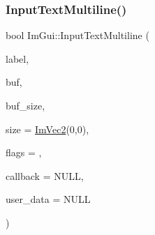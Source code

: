 \subsubsection{\texorpdfstring{Input\+Text\+Multiline()}{InputTextMultiline()}\hspace{0.1cm}{\footnotesize\ttfamily [2/2]}}
{\footnotesize\ttfamily bool Im\+Gui\+::\+Input\+Text\+Multiline (\begin{DoxyParamCaption}\item[{const char $\ast$}]{label,  }\item[{char $\ast$}]{buf,  }\item[{size\+\_\+t}]{buf\+\_\+size,  }\item[{const \mbox{\hyperlink{struct_im_vec2}{Im\+Vec2}} \&}]{size = {\ttfamily \mbox{\hyperlink{struct_im_vec2}{Im\+Vec2}}(0,0)},  }\item[{\mbox{\hyperlink{imgui_8h_a7d2c6153a6b9b5d3178ce82434ac9fb8}{Im\+Gui\+Input\+Text\+Flags}}}]{flags = {},  }\item[{\mbox{\hyperlink{imgui_8h_a65fd2b568a62c9aa2a28a8a13eb65ad7}{Im\+Gui\+Input\+Text\+Callback}}}]{callback = {\ttfamily NULL},  }\item[{void $\ast$}]{user\+\_\+data = {\ttfamily NULL} }\end{DoxyParamCaption})}

